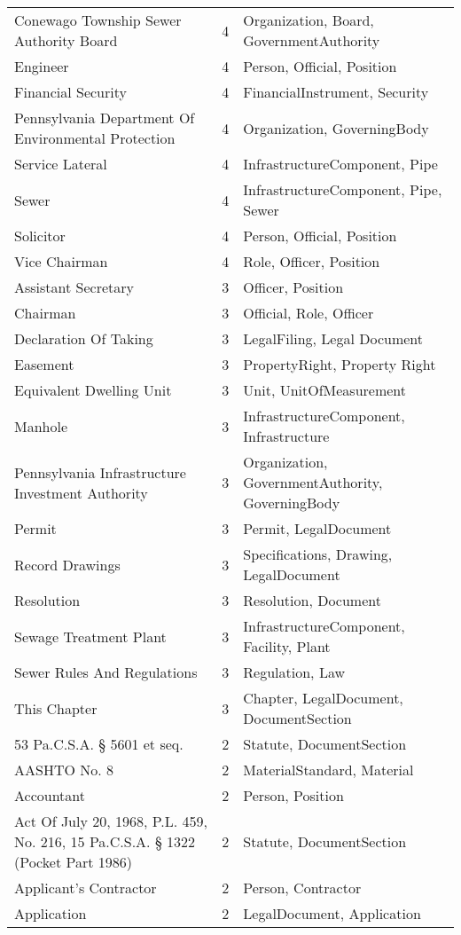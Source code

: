 \begin{longtable}{p{} p{} p{}}
Conewago Township Sewer Authority Board & 4 & Organization, Board, GovernmentAuthority \\
Engineer & 4 & Person, Official, Position \\
Financial Security & 4 & FinancialInstrument, Security \\
Pennsylvania Department Of Environmental Protection & 4 & Organization, GoverningBody \\
Service Lateral & 4 & InfrastructureComponent, Pipe \\
Sewer & 4 & InfrastructureComponent, Pipe, Sewer \\
Solicitor & 4 & Person, Official, Position \\
Vice Chairman & 4 & Role, Officer, Position \\
Assistant Secretary & 3 & Officer, Position \\
Chairman & 3 & Official, Role, Officer \\
Declaration Of Taking & 3 & LegalFiling, Legal Document \\
Easement & 3 & PropertyRight, Property Right \\
Equivalent Dwelling Unit & 3 & Unit, UnitOfMeasurement \\
Manhole & 3 & InfrastructureComponent, Infrastructure \\
Pennsylvania Infrastructure Investment Authority & 3 & Organization, GovernmentAuthority, GoverningBody \\
Permit & 3 & Permit, LegalDocument \\
Record Drawings & 3 & Specifications, Drawing, LegalDocument \\
Resolution & 3 & Resolution, Document \\
Sewage Treatment Plant & 3 & InfrastructureComponent, Facility, Plant \\
Sewer Rules And Regulations & 3 & Regulation, Law \\
This Chapter & 3 & Chapter, LegalDocument, DocumentSection \\
53 Pa.C.S.A. § 5601 et seq. & 2 & Statute, DocumentSection \\
AASHTO No. 8 & 2 & MaterialStandard, Material \\
Accountant & 2 & Person, Position \\
Act Of July 20, 1968, P.L. 459, No. 216, 15 Pa.C.S.A. § 1322 (Pocket Part 1986) & 2 & Statute, DocumentSection \\
Applicant's Contractor & 2 & Person, Contractor \\
Application & 2 & LegalDocument, Application \\

\end{longtable}
